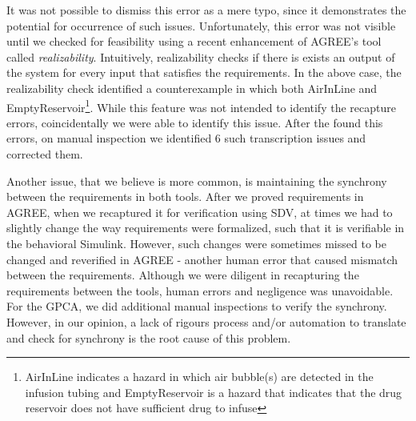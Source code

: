 It was not possible to dismiss this error as a mere typo, since it demonstrates the potential for occurrence of such issues. Unfortunately, this error was not visible until we checked for feasibility using a recent enhancement of AGREE's tool called \emph{realizability}. Intuitively, realizability checks if there is exists an output of the system for every input that satisfies the requirements. In the above case, the realizability check identified a counterexample in which both AirInLine and EmptyReservoir\footnote{AirInLine indicates a hazard in which air bubble(s) are detected in the infusion tubing and EmptyReservoir is a hazard that indicates that the drug reservoir does not have sufficient drug to infuse}. While this feature was not intended to identify the recapture errors, coincidentally we were able to identify this issue. After the found this errors, on manual inspection we identified 6 such transcription issues and corrected them. 

Another issue, that we believe is more common, is maintaining the synchrony between the requirements in both tools. After we proved requirements in AGREE, when we recaptured it for verification using SDV, at times we had to slightly change the way requirements were formalized, such that it is verifiable in the behavioral Simulink. However, such changes were sometimes missed to be changed and reverified in AGREE - another human error that caused mismatch between the requirements. Although we were diligent in recapturing the requirements between the tools, human errors and negligence was unavoidable. For the GPCA, we did additional manual inspections to verify the synchrony. However, in our opinion, a lack of rigours process and/or automation to translate and check for synchrony is the root cause of this problem. %

